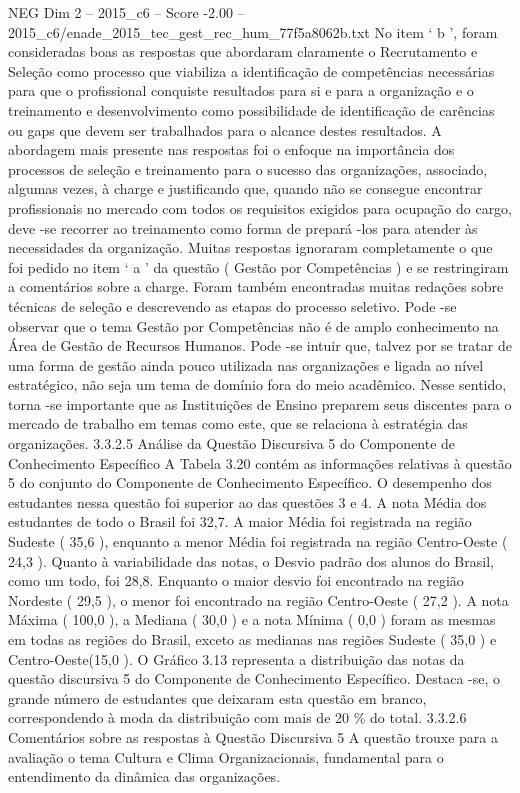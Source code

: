 \begin{textsample}{NEG Dim 2 – 2015\_c6 – Score -2.00 – 2015\_c6/enade\_2015\_tec\_gest\_rec\_hum\_77f5a8062b.txt}
No item ‘ b ’, foram consideradas boas as respostas que abordaram claramente o Recrutamento e Seleção como processo que viabiliza a identificação de competências necessárias para que o profissional conquiste resultados para si e para a organização e o treinamento e desenvolvimento como possibilidade de identificação de carências ou gaps que devem ser trabalhados para o alcance destes resultados.
A abordagem mais presente nas respostas foi o enfoque na importância dos processos de seleção e treinamento para o sucesso das organizações, associado, algumas vezes, à charge e justificando que, quando não se consegue encontrar profissionais no mercado com todos os requisitos exigidos para ocupação do cargo, deve -se recorrer ao treinamento como forma de prepará -los para atender às necessidades da organização.
Muitas respostas ignoraram completamente o que foi pedido no item ‘ a ’ da questão ( Gestão por Competências ) e se restringiram a comentários sobre a charge.
Foram também encontradas muitas redações sobre técnicas de seleção e descrevendo as etapas do processo seletivo.
Pode -se observar que o tema Gestão por Competências não é de amplo conhecimento na Área de Gestão de Recursos Humanos.
Pode -se intuir que, talvez por se tratar de uma forma de gestão ainda pouco utilizada nas organizações e ligada ao nível estratégico, não seja um tema de domínio fora do meio acadêmico.
Nesse sentido, torna -se importante que as Instituições de Ensino preparem seus discentes para o mercado de trabalho em temas como este, que se relaciona à estratégia das organizações. 3.3.2.5 Análise da Questão Discursiva 5 do Componente de Conhecimento Específico A Tabela 3.20 contém as informações relativas à questão 5 do conjunto do Componente de Conhecimento Específico.
O desempenho dos estudantes nessa questão foi superior ao das questões 3 e 4.
A nota Média dos estudantes de todo o Brasil foi 32,7.
A maior Média foi registrada na região Sudeste ( 35,6 ), enquanto a menor Média foi registrada na região Centro-Oeste ( 24,3 ).
Quanto à variabilidade das notas, o Desvio padrão dos alunos do Brasil, como um todo, foi 28,8.
Enquanto o maior desvio foi encontrado na região Nordeste ( 29,5 ), o menor foi encontrado na região Centro-Oeste ( 27,2 ).
A nota Máxima ( 100,0 ), a Mediana ( 30,0 ) e a nota Mínima ( 0,0 ) foram as mesmas em todas as regiões do Brasil, exceto as medianas nas regiões Sudeste ( 35,0 ) e Centro-Oeste(15,0 ).
O Gráfico 3.13 representa a distribuição das notas da questão discursiva 5 do Componente de Conhecimento Específico.
Destaca -se, o grande número de estudantes que deixaram esta questão em branco, correspondendo à moda da distribuição com mais de 20 \% do total. 3.3.2.6 Comentários sobre as respostas à Questão Discursiva 5 A questão trouxe para a avaliação o tema Cultura e Clima Organizacionais, fundamental para o entendimento da dinâmica das organizações.

\end{textsample}
